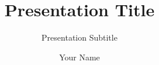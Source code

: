 \author{Your Name}
\title{Presentation Title}
\subtitle{Presentation Subtitle}

\date{\now}

\subject{Presentation Title}

